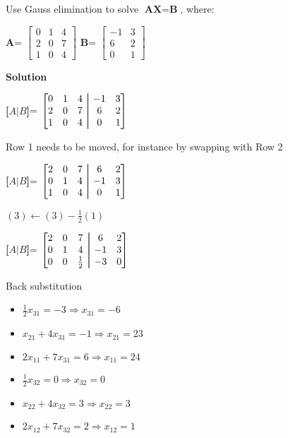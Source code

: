 \begin{exercise}{4} %
Use Gauss elimination to solve $\textbf{AX}=\textbf{B}$, where:
\begin{center}
\textbf{A}= 
$\begin{bmatrix}
0&1&4\\ 
2&0&7\\
1&0&4
\end{bmatrix}
$ 
\textbf{B}= 
$\begin{bmatrix}
-1&3\\ 6&2\\ 0&1
\end{bmatrix}
$ 
\end{center}
\textbf{Solution}\\
\begin{center}
\textbf{[$A \vert B$]}= 
$\begin{bmatrix}
0&1&4 &\aug&-1&3\\ 
2&0&7 &\aug& 6&2\\
1&0&4 &\aug& 0&1
\end{bmatrix}
$ 
\end{center}
Row 1 needs to be moved, for instance by swapping with Row 2\\
\begin{center}
\textbf{[$A \vert B$]}= 
$\begin{bmatrix}
2&0&7 &\aug& 6&2\\
0&1&4 &\aug&-1&3\\ 
1&0&4 &\aug& 0&1
\end{bmatrix}
$ 
\end{center}
$(3) \leftarrow (3) - \frac{1}{2}(1)$
\begin{center}
\textbf{[$A \vert B$]}= 
$\begin{bmatrix}
2&0&7 &\aug& 6&2\\
0&1&4 &\aug&-1&3\\ 
0&0&\frac{1}{2} &\aug& -3&0
\end{bmatrix}
$
\end{center}

Back substitution
\begin{multicols}{2}
\begin{itemize}
\item $\frac{1}{2}x_{31} = -3 \Rightarrow x_{31} = -6$
\item $x_{21}+4x_{31} = -1 \Rightarrow x_{21} = 23$
\item $2x_{11}+7x_{31} = 6 \Rightarrow x_{11} = 24$
\end{itemize}
\begin{itemize}
\item $\frac{1}{2}x_{32} = 0 \Rightarrow x_{32} = 0$
\item $x_{22}+4x_{32} = 3 \Rightarrow x_{22} = 3$
\item $2x_{12}+7x_{32} = 2 \Rightarrow x_{12} = 1$
\end{itemize}
\end{multicols}
\end{exercise}
